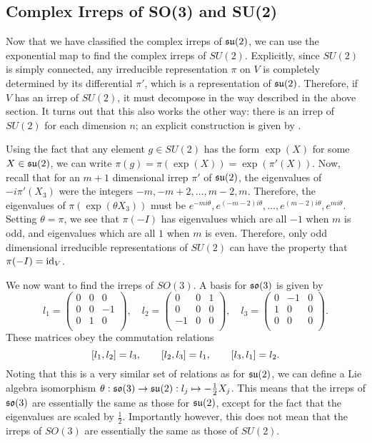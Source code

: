\documentclass[a4paper]{article}
\begin{document}
\subsection{Complex Irreps of SO(3) and SU(2)}

Now that we have classified the complex irreps of $\mathfrak{su}(2)$, we can use the exponential map to find the complex irreps of $SU(2)$. Explicitly, since $SU(2)$ is simply connected, any irreducible representation $\pi$ on $V$ is completely determined by its differential $\pi'$, which is a representation of $\mathfrak{su}(2)$. Therefore, if $V$ has an irrep of $SU(2)$, it must decompose in the way described in the above section. It turns out that this also works the other way: there is an irrep of $SU(2)$ for each dimension $n$; an explicit construction is given by \cite{woit}. 

Using the fact that any element $g \in SU(2)$ has the form $\exp(X)$ for some $X \in \mathfrak{su}(2)$, we can write $\pi(g) = \pi(\exp(X)) = \exp(\pi'(X))$. Now, recall that for an $m + 1$ dimensional irrep $\pi'$ of $\mathfrak{su}(2)$, the eigenvalues of $-i\pi'(X_3)$ were the integers $-m, -m + 2, \hdots, m - 2, m$. Therefore, the eigenvalues of $\pi(\exp(\theta X_3))$ must be $e^{-mi\theta}, e^{(-m-2)i\theta}, \hdots, e^{(m - 2)i\theta}, e^{mi\theta}$. Setting $\theta = \pi$, we see that $\pi(-I)$ has eigenvalues which are all $-1$ when $m$ is odd, and eigenvalues which are all $1$ when $m$ is even. Therefore, only odd dimensional irreducible representations of $SU(2)$ can have the property that $\pi(-I) = \operatorname{id}_V$. 

We now want to find the irreps of $SO(3)$. A basis for $\mathfrak{so}(3)$ is given by 
$$l_1 = \begin{pmatrix} 0 & 0 & 0 \\ 0 & 0 & -1 \\ 0 & 1 & 0 \\ \end{pmatrix}, \hspace{1em} l_2 = \begin{pmatrix} 0 & 0 & 1 \\ 0 & 0 & 0 \\ -1 & 0 & 0 \\ \end{pmatrix}, \hspace{1em} l_3 = \begin{pmatrix} 0 & -1 & 0 \\ 1 & 0 & 0 \\ 0 & 0 & 0 \\ \end{pmatrix}.$$
These matrices obey the commutation relations
$$ \left[ l_1, l_2 \right] = l_3, \hspace{2em} \left[ l_2, l_3 \right] = l_1, \hspace{2em} \left[ l_3, l_1 \right] = l_2.$$
Noting that this is a very similar set of relations as for $\mathfrak{su}(2)$, we can define a Lie algebra isomorphism $\theta : \mathfrak{so}(3) \to \mathfrak{su}(2): l_j \mapsto -\frac{1}{2}X_j$. This means that the irreps of $\mathfrak{so}(3)$ are essentially the same as those for $\mathfrak{su}(2)$, except for the fact that the eigenvalues are scaled by $\frac{1}{2}$. Importantly however, this does not mean that the irreps of $SO(3)$ are essentially the same as those of $SU(2)$. 
\end{document}
